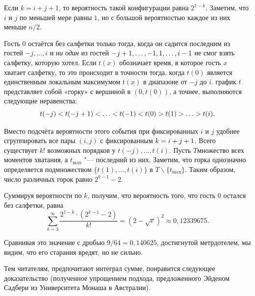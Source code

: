 \documentclass[twoside]{book}
\begin{document}
Если $k = i+j+1$, то вероятность такой конфигурации равна $2^{1-k}$.
Заметим, что $i$ и $j$ по меньшей мере равны $1$, но с большой вероятностью каждое из них меньше $n/2$.

Гость $0$ остаётся без салфетки только тогда, когда он садится последним из гостей $-j,\dots,i$ и \emph{ни один} из гостей $-j\z+1,\z\dots,-1,1,\dots,i-1$ не смог взять салфетку, которую хотел.
Если $t(x)$ обозначает время, в которое гость $x$ хватает салфетку, то это происходит в точности тогда, когда $t(0)$ является единственным локальным максимумом  $t(x)$ в диапазоне от $-j$ до $i$.
 график  $t$ представляет собой «горку» с вершиной в $(0,t(0))$, 
а точнее, выполняются следующие неравенства: 
\[t(-j)\z<t(-j+1) \z<\z\dots\z<t(-1)\z<t(0)\z>t(1)\z>\z\dots\z>t(i).\]

Вместо подсчёта вероятности этого события при фиксированных $i$ и $j$ удобнее сгруппировать все пары $(i, j)$ с фиксированным $k=i\z+j+1$.
Всего существует $k!$ возможных порядков у $t(-j),\dots, t (i)$.
Пусть $T$множество всех моментов хватания, а $t_{{\max}}$ "--- последний из них. 
Заметим, что горка однозначно определяется подмножеством $\{t(1),\dots,t(i)\}$ в $T\backslash \{t_{{\max}}\}$.
Таким образом, число различных горок равно $2^{k-1}-2$.

Суммируя вероятности по $k$, получим, что вероятность того, что гость 0 остался без салфетки, равна
\[\sum_{k=3}^\infty\frac{2^{1-k}\cdot(2^{k-1}-2)}{k!}=(2-\sqrt{e})^2\approx 0{,}12339675.\]
\heartf

Сравнивая это значение с дробью $9/64 = 0{,}140625$, достигнутой метрдотелем, мы видим, что его старания вредят, но не сильно.


Тем читателям,  предпочитают интеграл сумме, понравится следующее доказательство (полученное упрощением подхода, предложенного Эйденом Садбери из Университета Монаша в Австралии).

\end{document}
